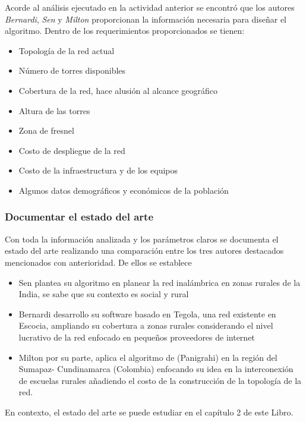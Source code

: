 \documentclass[]{article}
\providecommand{\tightlist}{%
  \setlength{\itemsep}{0pt}\setlength{\parskip}{0pt}}
\begin{document}
Acorde al análisis ejecutado en la actividad anterior se encontró que
los autores \emph{Bernardi}, \emph{Sen} y \emph{Milton} proporcionan la
información necesaria para diseñar el algoritmo. Dentro de los
requerimientos proporcionados se tienen:

\begin{itemize}
\tightlist
\item
  Topología de la red actual
\item
  Número de torres disponibles
\item
  Cobertura de la red, hace alusión al alcance geográfico
\item
  Altura de las torres
\item
  Zona de fresnel
\item
  Costo de despliegue de la red
\item
  Costo de la infraestructura y de los equipos
\item
  Algunos datos demográficos y económicos de la población
\end{itemize}

\subsubsection{\texorpdfstring{\textbf{Documentar el estado del
arte}}{Documentar el estado del arte}}\label{documentar-el-estado-del-arte}

Con toda la información analizada y los parámetros claros se documenta
el estado del arte realizando una comparación entre los tres autores
destacados mencionados con anterioridad. De ellos se establece

\begin{itemize}
\item
  Sen plantea su algoritmo en planear la red inalámbrica en zonas
  rurales de la India, se sabe que su contexto es social y rural
\item
  Bernardi desarrollo su software basado en Tegola, una red existente en
  Escocia, ampliando su cobertura a zonas rurales considerando el nivel
  lucrativo de la red enfocado en pequeños proveedores de internet
\item
  Milton por su parte, aplica el algoritmo de (Panigrahi) en la región
  del Sumapaz- Cundinamarca (Colombia) enfocando su idea en la
  interconexión de escuelas rurales añadiendo el costo de la
  construcción de la topología de la red.
\end{itemize}

En contexto, el estado del arte se puede estudiar en el capítulo 2 de
este Libro.
\end{document}
